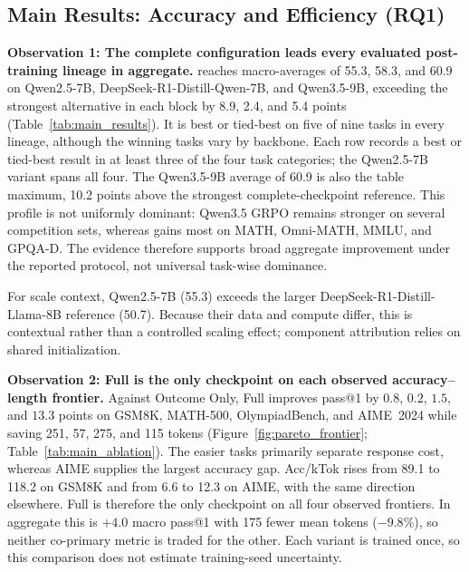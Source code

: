 \subsection{Main Results: Accuracy and Efficiency (RQ1)}
\label{sec:rq1}

\noindent\textbf{Observation 1: The complete configuration leads every evaluated post-training lineage in aggregate.}
\method reaches macro-averages of 55.3, 58.3, and 60.9 on Qwen2.5-7B, DeepSeek-R1-Distill-Qwen-7B, and Qwen3.5-9B, exceeding the strongest alternative in each block by 8.9, 2.4, and 5.4 points (Table~\ref{tab:main_results}). It is best or tied-best on five of nine tasks in every lineage, although the winning tasks vary by backbone. Each \method row records a best or tied-best result in at least three of the four task categories; the Qwen2.5-7B variant spans all four. The Qwen3.5-9B average of 60.9 is also the table maximum, 10.2 points above the strongest complete-checkpoint reference. This profile is not uniformly dominant: Qwen3.5 GRPO remains stronger on several competition sets, whereas \method gains most on MATH, Omni-MATH, MMLU, and GPQA-D. The evidence therefore supports broad aggregate improvement under the reported protocol, not universal task-wise dominance.

For scale context, Qwen2.5-7B \method (55.3) exceeds the larger DeepSeek-R1-Distill-Llama-8B reference (50.7). Because their data and compute differ, this is contextual rather than a controlled scaling effect; component attribution relies on shared initialization.

\noindent\textbf{Observation 2: Full is the only checkpoint on each observed accuracy--length frontier.}
Against Outcome Only, Full improves pass@1 by $0.8$, $0.2$, $1.5$, and $13.3$ points on GSM8K, MATH-500, OlympiadBench, and AIME~2024 while saving 251, 57, 275, and 115 tokens (Figure~\ref{fig:pareto_frontier}; Table~\ref{tab:main_ablation}). The easier tasks primarily separate response cost, whereas AIME supplies the largest accuracy gap. Acc/kTok rises from 89.1 to 118.2 on GSM8K and from 6.6 to 12.3 on AIME, with the same direction elsewhere. Full is therefore the only checkpoint on all four observed frontiers. In aggregate this is $+4.0$ macro pass@1 with 175 fewer mean tokens ($-9.8\%$), so neither co-primary metric is traded for the other. Each variant is trained once, so this comparison does not estimate training-seed uncertainty.

